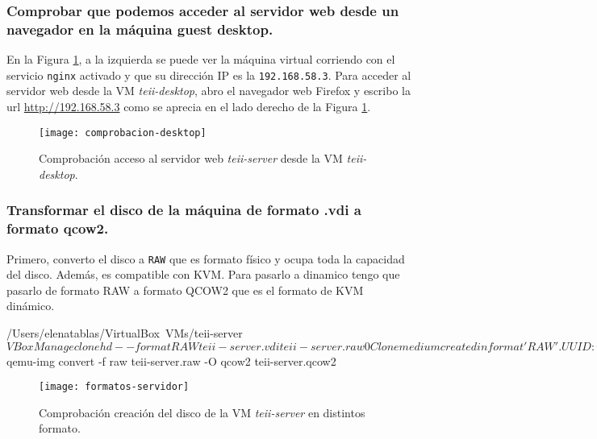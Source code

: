 \subsubsection{Comprobar que podemos acceder al servidor web desde un navegador en la máquina guest desktop.}

\par En la Figura \ref{fig:comprobacion-desktop}, a la izquierda se puede ver la máquina virtual 
corriendo con el servicio \texttt{nginx} activado y que su dirección IP es la \texttt{192.168.58.3}.
Para acceder al servidor web desde la VM \textit{teii-desktop}, abro el navegador web Firefox y escribo la url \url{http://192.168.58.3}
como se aprecia en el lado derecho de la Figura \ref{fig:comprobacion-desktop}.

 \begin{figure}[H]
    \texttt{[image: comprobacion-desktop]}
    \centering
    \caption{Comprobación acceso al servidor web \textit{teii-server} desde la VM \textit{teii-desktop}.}
    \label{fig:comprobacion-desktop}
\end{figure}

\subsubsection{Transformar el disco de la máquina de formato .vdi a formato qcow2.}
\par Primero, converto el disco a \texttt{RAW} que es formato físico y ocupa toda la capacidad del disco. Además,
es compatible con KVM. Para pasarlo a dinamico tengo que pasarlo de formato RAW a formato QCOW2 que es el formato de KVM dinámico.

\begin{listing}[style=consola]
    /Users/elenatablas/VirtualBox\ VMs/teii-server $ VBoxManage clonehd --format RAW teii-server.vdi teii-server.raw
    0%
    Clone medium created in format 'RAW'. UUID: 641c1985-b349-47bd-8d43-f7d1333bf566
    /Users/elenatablas/VirtualBox\ VMs/teii-server $ qemu-img convert -f raw teii-server.raw -O qcow2 teii-server.qcow2
\end{listing}
\begin{figure}[H]
    \texttt{[image: formatos-servidor]}
    \centering
    \caption{Comprobación creación del disco de la VM \textit{teii-server} en distintos formato.}
    \label{fig:formatos-servidor}
\end{figure}

